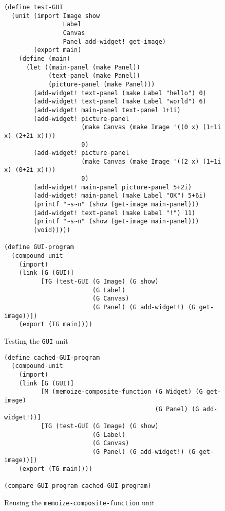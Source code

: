 \documentclass{article}
\newcommand{\code}[1]{\texttt{#1}}
\begin{document}
\begin{figure}
\caption{Testing the \code{GUI} unit}
\label{test-GUI}
\begin{verbatim}
(define test-GUI
  (unit (import Image show
                Label
                Canvas
                Panel add-widget! get-image)
        (export main)
    (define (main)
      (let ((main-panel (make Panel))
            (text-panel (make Panel))
            (picture-panel (make Panel)))
        (add-widget! text-panel (make Label "hello") 0)
        (add-widget! text-panel (make Label "world") 6)
        (add-widget! main-panel text-panel 1+1i)
        (add-widget! picture-panel
                     (make Canvas (make Image '((0 x) (1+1i x) (2+2i x))))
                     0)
        (add-widget! picture-panel
                     (make Canvas (make Image '((2 x) (1+1i x) (0+2i x))))
                     0)
        (add-widget! main-panel picture-panel 5+2i)
        (add-widget! main-panel (make Label "OK") 5+6i)
        (printf "~s~n" (show (get-image main-panel)))
        (add-widget! text-panel (make Label "!") 11)
        (printf "~s~n" (show (get-image main-panel)))
        (void)))))

(define GUI-program
  (compound-unit
    (import)
    (link [G (GUI)]
          [TG (test-GUI (G Image) (G show)
                        (G Label)
                        (G Canvas)
                        (G Panel) (G add-widget!) (G get-image))])
    (export (TG main))))
\end{verbatim}
\end{figure}

\begin{figure}
\caption{Reusing the \code{memoize-composite-function} unit}
\label{cached-GUI-program}
\begin{verbatim}
(define cached-GUI-program
  (compound-unit
    (import)
    (link [G (GUI)]
          [M (memoize-composite-function (G Widget) (G get-image)
                                         (G Panel) (G add-widget!))]
          [TG (test-GUI (G Image) (G show)
                        (G Label)
                        (G Canvas)
                        (G Panel) (G add-widget!) (G get-image))])
    (export (TG main))))

(compare GUI-program cached-GUI-program)
\end{verbatim}
\end{figure}
\end{document}
